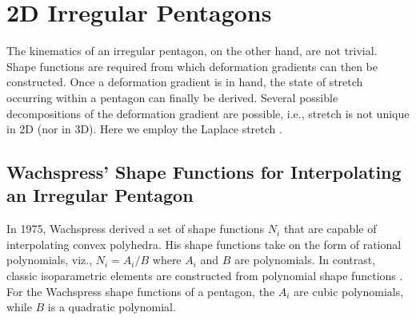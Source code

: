 \section{2D Irregular Pentagons}

The kinematics of an irregular pentagon, on the other hand, are not trivial.  Shape functions are required from which deformation gradients can then be constructed.  Once a deformation gradient is in hand, the state of stretch occurring within a pentagon can finally be derived.  Several possible decompositions of the deformation gradient are possible, i.e., stretch is not unique in 2D (nor in 3D).  Here we employ the Laplace stretch \cite{Freedetal19}.

\subsection{Wachspress' Shape Functions for Interpolating an Irregular Pentagon}
\label{secShapeFns}

In 1975, Wachspress \cite{Wachspress75,Wachspress16} derived a set of shape functions $N_i$ that are capable of interpolating convex polyhedra.  His shape functions take on the form of rational polynomials, viz., $N_i = A_i / B$ where $A_i$ and $B$ are polynomials.  In contrast, classic isoparametric elements are constructed from polynomial shape functions \cite{Hughes87}.  For the Wachspress shape functions of a pentagon, the $A_i$ are cubic polynomials, while $B$ is a quadratic polynomial.

